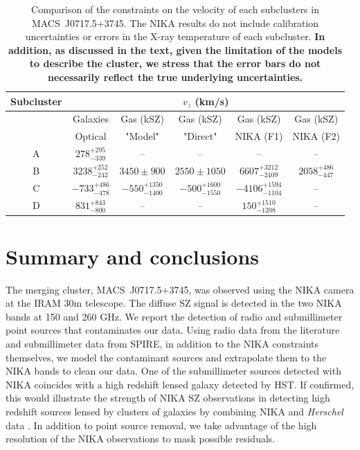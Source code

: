 \documentclass[twocolumn,traditabstract]{aa}
\begin{document}
\begin{table}[h]
\caption{{\footnotesize Comparison of the constraints on the velocity of each subclusters in \mbox{MACS~J0717.5+3745}. The NIKA results do not include calibration uncertainties or errors in the X-ray temperature of each subcluster. {\bf In addition, as discussed in the text, given the limitation of the models to describe the cluster, we stress that the error bars do not necessarily reflect the true underlying uncertainties.}}}
\begin{center}
\begin{tabular}{c|c|c|c|c|c}
\hline
\hline
Subcluster & \multicolumn{5}{c}{$v_z$ (km/s)} \\
\hline
 & Galaxies & Gas (kSZ) & Gas (kSZ) & Gas (kSZ) & Gas (kSZ) \\
 & Optical \citep{Ma2009} & "Model" \citep{Sayers2013} & "Direct" \citep{Sayers2013} & NIKA (F1) & NIKA (F2) \\
\hline
A & $278^{+295}_{-339}$ & -- & -- & -- & -- \\
B & $3238^{+252}_{-242}$ & $3450 \pm 900$ & $2550 \pm 1050$ & $6607_{-2409}^{+3212}$ & $2058_{-447}^{+486}$ \\
C & $-733^{+486}_{-478}$ & $-550^{+1350}_{-1400}$ & $-500^{+1600}_{-1550}$ & $-4106_{-1104}^{+1594}$ & -- \\
D & $831^{+843}_{-800}$ & -- & -- & $150_{-1208}^{+1510}$ & -- \\
\hline
\end{tabular}
\end{center}
\label{tab:comparison_velocity_measurements}
\end{table}

\section{Summary and conclusions}\label{sec:conclusions} 
The merging cluster, \mbox{MACS~J0717.5+3745}, was observed using the NIKA camera at the IRAM 30m telescope. The diffuse SZ signal is detected in the two NIKA bands at 150 and 260 GHz. We report the detection of radio and submillimeter point sources that contaminates our data. Using radio data from the literature and submillimeter data from SPIRE, in addition to the NIKA constraints themselves, we model the contaminant sources and extrapolate them to the NIKA bands to clean our data. One of the submillimeter sources detected with NIKA coincides with a high redshift lensed galaxy detected by HST. If confirmed, this would illustrate the strength of NIKA SZ observations in detecting high redshift sources lensed by clusters of galaxies by combining NIKA and \textit{Herschel} data \citep[see also][]{Adam2015,Adam2016}. In addition to point source removal, we take advantage of the high resolution of the NIKA observations to mask possible residuals.
\end{document}
